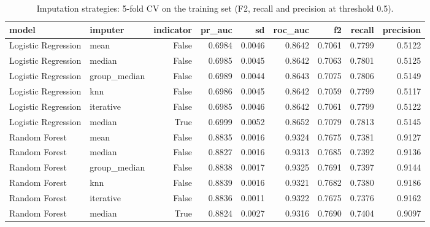 \begin{table}[H]
\centering
\scriptsize
\begin{adjustbox}{max width=\linewidth}
\begin{tabular}{llrrrrrrr}
\toprule
model & imputer & indicator & pr\_auc & sd & roc\_auc & f2 & recall & precision \\
\midrule
Logistic Regression & mean & False & 0.6984 & 0.0046 & 0.8642 & 0.7061 & 0.7799 & 0.5122 \\
Logistic Regression & median & False & 0.6985 & 0.0045 & 0.8642 & 0.7063 & 0.7801 & 0.5125 \\
Logistic Regression & group\_median & False & 0.6989 & 0.0044 & 0.8643 & 0.7075 & 0.7806 & 0.5149 \\
Logistic Regression & knn & False & 0.6986 & 0.0045 & 0.8642 & 0.7059 & 0.7799 & 0.5117 \\
Logistic Regression & iterative & False & 0.6985 & 0.0046 & 0.8642 & 0.7061 & 0.7799 & 0.5122 \\
Logistic Regression & median & True & 0.6999 & 0.0052 & 0.8652 & 0.7079 & 0.7813 & 0.5145 \\
Random Forest & mean & False & 0.8835 & 0.0016 & 0.9324 & 0.7675 & 0.7381 & 0.9127 \\
Random Forest & median & False & 0.8827 & 0.0016 & 0.9313 & 0.7685 & 0.7392 & 0.9136 \\
Random Forest & group\_median & False & 0.8838 & 0.0017 & 0.9325 & 0.7691 & 0.7397 & 0.9144 \\
Random Forest & knn & False & 0.8839 & 0.0016 & 0.9321 & 0.7682 & 0.7380 & 0.9186 \\
Random Forest & iterative & False & 0.8836 & 0.0011 & 0.9322 & 0.7675 & 0.7376 & 0.9162 \\
Random Forest & median & True & 0.8824 & 0.0027 & 0.9316 & 0.7690 & 0.7404 & 0.9097 \\
\bottomrule
\end{tabular}
\end{adjustbox}
\caption{Imputation strategies: 5-fold CV on the training set (F2, recall and precision at threshold 0.5).}
\label{tab:suite_imputation}
\end{table}
